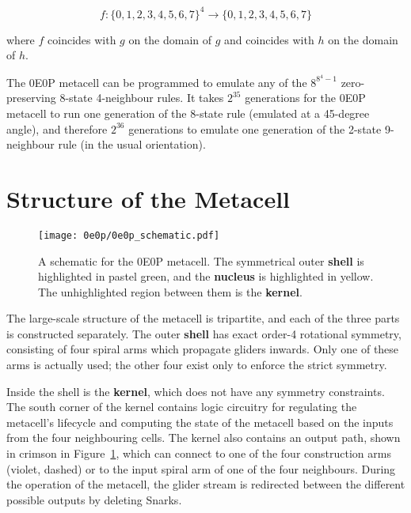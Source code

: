 $$ f : \{ 0, 1, 2, 3, 4, 5, 6, 7 \}^4 \rightarrow
\{0, 1, 2, 3, 4, 5, 6, 7 \} $$

where $f$ coincides with $g$ on the domain of $g$ and coincides with $h$
on the domain of $h$.


The 0E0P metacell can be programmed to emulate any of the $8^{8^4-1}$
zero-preserving 8-state 4-neighbour rules. It takes $2^{35}$ generations
for the 0E0P metacell to run one generation of the 8-state rule (emulated
at a 45-degree angle), and therefore $2^{36}$ generations to emulate one
generation of the 2-state 9-neighbour rule (in the usual orientation).

\section{Structure of the Metacell}

\begin{figure}[htb]
    \centering
    \texttt{[image: 0e0p/0e0p\_schematic.pdf]}
    \caption{A schematic for the 0E0P metacell. The symmetrical outer
    \textbf{shell} is highlighted in pastel green, and the \textbf{nucleus}
    is highlighted in yellow. The unhighlighted region between them is the
    \textbf{kernel}.}\label{fig:0e0p_schematic}
\end{figure}

The large-scale structure of the metacell is tripartite, and each of the
three parts is constructed separately. The outer \textbf{shell} has exact
order-4 rotational symmetry, consisting of four spiral arms which propagate
gliders inwards. Only one of these arms is actually used; the other four
exist only to enforce the strict symmetry.

Inside the shell is the \textbf{kernel}, which does not have any symmetry
constraints. The south corner of the kernel contains logic circuitry for
regulating the metacell's lifecycle and computing the state of the metacell
based on the inputs from the four neighbouring cells. The kernel also contains
an output path, shown in crimson in Figure~\ref{fig:0e0p_schematic}, which
can connect to one of the four construction arms (violet, dashed) or to the
input spiral arm of one of the four neighbours. During the operation of the
metacell, the glider stream is redirected between the different possible
outputs by deleting Snarks.

